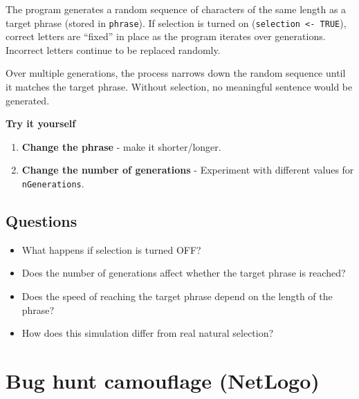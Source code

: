 \documentclass[
  a4paper]{book}
\providecommand{\tightlist}{%
  \setlength{\itemsep}{0pt}\setlength{\parskip}{0pt}}
\begin{document}
The program generates a random sequence of characters of the same length as a target phrase (stored in \texttt{phrase}). If selection is turned on (\texttt{selection\ \textless{}-\ TRUE}), correct letters are ``fixed'' in place as the program iterates over generations. Incorrect letters continue to be replaced randomly.

Over multiple generations, the process narrows down the random sequence until it matches the target phrase. Without selection, no meaningful sentence would be generated.

\textbf{Try it yourself }

\begin{enumerate}
\def\labelenumi{\arabic{enumi})}
\tightlist
\item
  \textbf{Change the phrase} - make it shorter/longer.
\item
  \textbf{Change the number of generations} - Experiment with different values for \texttt{nGenerations}.
\end{enumerate}

\section{Questions}\label{questions}

\begin{itemize}
\tightlist
\item
  What happens if selection is turned OFF?
\end{itemize}

\begin{itemize}
\tightlist
\item
  Does the number of generations affect whether the target phrase is reached?
\end{itemize}

\begin{itemize}
\tightlist
\item
  Does the speed of reaching the target phrase depend on the length of the phrase?
\end{itemize}

\begin{itemize}
\tightlist
\item
  How does this simulation differ from real natural selection?
\end{itemize}

\chapter{Bug hunt camouflage (NetLogo)}\label{bug-hunt-camouflage-netlogo}
\end{document}
